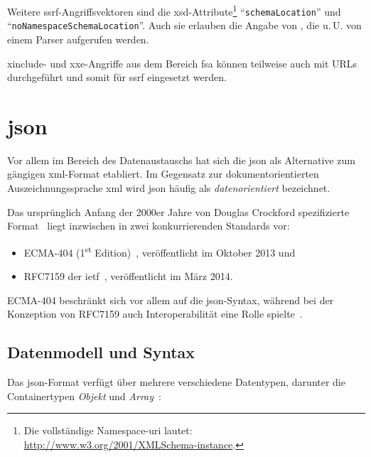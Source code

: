 Weitere \acrshort{ssrf}-Angriffsvektoren sind die \acrshort{xsd}-Attribute\footnote{Die vollständige Namespace-\acrshort{uri} lautet: \url{http://www.w3.org/2001/XMLSchema-instance}.} \enquote{\texttt{schemaLocation}} und \linebreak{}\enquote{\texttt{noNamespaceSchemaLocation}}. Auch sie erlauben die Angabe von , die u.\,U. von einem Parser aufgerufen werden.\cite[S.~8f]{morgan2014xml}

\acrshort{xinclude}- und \acrshort{xxe}-Angriffe aus dem Bereich \acrlong{fsa} können teilweise auch mit URLs durchgeführt und somit für \acrlong{ssrf} eingesetzt werden.

\section{\acrfull{json}}
\label{sec:json}

Vor allem im Bereich des Datenaustauschs hat sich die \acrfull{json} als Alternative zum gängigen \acrshort{xml}-Format etabliert. Im Gegensatz zur dokumentorientierten Auszeichnungssprache \acrshort{xml} wird \acrshort{json} häufig als \emph{datenorientiert} bezeichnet.~\cite{gupta2007xmljson}

Das ursprünglich Anfang der 2000er Jahre von Douglas Crockford spezifizierte Format~\cite{crockford2009jsonsaga} liegt inzwischen in zwei konkurrierenden Standards vor:
\begin{itemize}
    \item{} ECMA-404 (1\textsuperscript{st} Edition)~\cite{ecma404}, veröffentlicht im Oktober 2013 und
    \item{} RFC7159 der \acrfull{ietf}~\cite{rfc7159}, veröffentlicht im März 2014.
\end{itemize}

ECMA-404 beschränkt sich vor allem auf die \acrshort{json}-Syntax, während bei der Konzeption von RFC7159 auch Interoperabilität eine Rolle spielte~\cite{bray2014jsonredux}.

\subsection{Datenmodell und Syntax}
\label{sec:jsontypes}

Das \acrshort{json}-Format verfügt über mehrere verschiedene Datentypen, darunter die Containertypen \emph{Objekt} und \emph{Array}~\cite{ecma404}:

